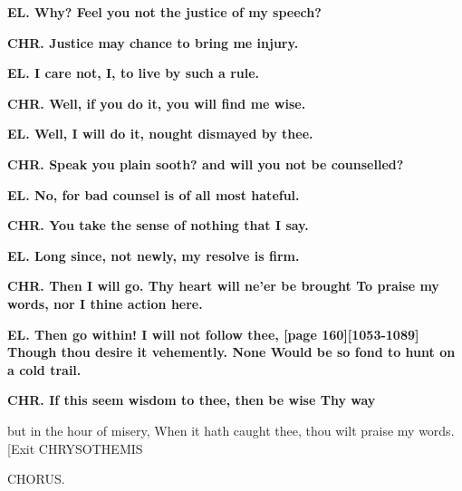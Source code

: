 \documentclass[11pt,letter]{book}
\begin{document}
\par \textbf{EL. Why? Feel you not the justice of my speech?}
\par 

\par \textbf{CHR. Justice may chance to bring me injury.}
\par 

\par \textbf{EL. I care not, I, to live by such a rule.}
\par 

\par \textbf{CHR. Well, if you do it, you will find me wise.}
\par 

\par \textbf{EL. Well, I will do it, nought dismayed by thee.}
\par 

\par \textbf{CHR. Speak you plain sooth? and will you not be counselled?}
\par 

\par \textbf{EL. No, for bad counsel is of all most hateful.}
\par 

\par \textbf{CHR. You take the sense of nothing that I say.}
\par 

\par \textbf{EL. Long since, not newly, my resolve is firm.}
\par 

\par \textbf{CHR. Then I will go. Thy heart will ne’er be brought To praise my words, nor I thine action here.}
\par 

\par \textbf{EL. Then go within! I will not follow thee, [page 160][1053-1089] Though thou desire it vehemently. None Would be so fond to hunt on a cold trail.}
\par 

\par \textbf{CHR. If this seem wisdom to thee, then be wise Thy way}
\par   but in the hour of misery, When it hath caught thee, thou wilt praise my words. [Exit CHRYSOTHEMIS

\par  CHORUS.
\end{document}
